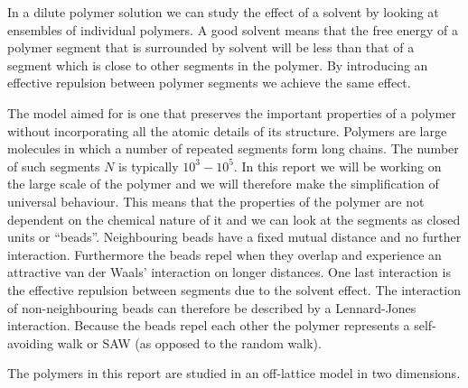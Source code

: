 In a dilute polymer solution we can study the effect of a solvent by looking at ensembles of individual polymers. A good solvent means that the free energy of a polymer segment that is surrounded by solvent will be less than that of a segment which is close to other segments in the polymer. By introducing an effective repulsion between polymer segments we achieve the same effect.

The model aimed for is one that preserves the important properties of a polymer without incorporating all the atomic details of its structure. Polymers are large molecules in which a number of repeated segments form long chains. The number of such segments $N$ is typically $10^3 - 10^5$. In this report we will be working on the large scale of the polymer and we will therefore make the simplification of universal behaviour. This means that the properties of the polymer are not dependent on the chemical nature of it and we can look at the segments as closed units or ``beads''. Neighbouring beads have a fixed mutual distance and no further interaction. Furthermore the beads repel when they overlap and experience an attractive van der Waals' interaction on longer distances. One last interaction is the effective repulsion between segments due to the solvent effect. The interaction of non-neighbouring beads can therefore be described by a Lennard-Jones interaction. Because the beads repel each other the polymer represents a self-avoiding walk or SAW (as opposed to the random walk).

The polymers in this report are studied in an off-lattice model in two dimensions.